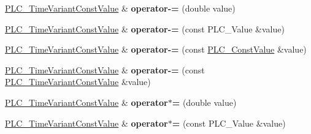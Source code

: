 \begin{DoxyCompactItemize}
\item 
\hypertarget{classns3_1_1PLC__TimeVariantConstValue_a9b188dbf50487e89a085ddb3b8d89bef}{\hyperlink{classns3_1_1PLC__TimeVariantConstValue}{\-P\-L\-C\-\_\-\-Time\-Variant\-Const\-Value} \& {\bfseries operator-\/=} (double value)}\label{classns3_1_1PLC__TimeVariantConstValue_a9b188dbf50487e89a085ddb3b8d89bef}

\item 
\hypertarget{classns3_1_1PLC__TimeVariantConstValue_af7d15a91624d5f6524967326b73e2f4c}{\hyperlink{classns3_1_1PLC__TimeVariantConstValue}{\-P\-L\-C\-\_\-\-Time\-Variant\-Const\-Value} \& {\bfseries operator-\/=} (const \-P\-L\-C\-\_\-\-Value \&value)}\label{classns3_1_1PLC__TimeVariantConstValue_af7d15a91624d5f6524967326b73e2f4c}

\item 
\hypertarget{classns3_1_1PLC__TimeVariantConstValue_a72ef5cc1060865ace5d202574e70672e}{\hyperlink{classns3_1_1PLC__TimeVariantConstValue}{\-P\-L\-C\-\_\-\-Time\-Variant\-Const\-Value} \& {\bfseries operator-\/=} (const \hyperlink{classns3_1_1PLC__ConstValue}{\-P\-L\-C\-\_\-\-Const\-Value} \&value)}\label{classns3_1_1PLC__TimeVariantConstValue_a72ef5cc1060865ace5d202574e70672e}

\item 
\hypertarget{classns3_1_1PLC__TimeVariantConstValue_a7742da3fea366241325e4a828bf9d600}{\hyperlink{classns3_1_1PLC__TimeVariantConstValue}{\-P\-L\-C\-\_\-\-Time\-Variant\-Const\-Value} \& {\bfseries operator-\/=} (const \hyperlink{classns3_1_1PLC__TimeVariantConstValue}{\-P\-L\-C\-\_\-\-Time\-Variant\-Const\-Value} \&value)}\label{classns3_1_1PLC__TimeVariantConstValue_a7742da3fea366241325e4a828bf9d600}

\item 
\hypertarget{classns3_1_1PLC__TimeVariantConstValue_aad652a2600842a68bd4b8e409973ab31}{\hyperlink{classns3_1_1PLC__TimeVariantConstValue}{\-P\-L\-C\-\_\-\-Time\-Variant\-Const\-Value} \& {\bfseries operator$\ast$=} (double value)}\label{classns3_1_1PLC__TimeVariantConstValue_aad652a2600842a68bd4b8e409973ab31}

\item 
\hypertarget{classns3_1_1PLC__TimeVariantConstValue_a280e4bd69e9e9183c8e636688a486f29}{\hyperlink{classns3_1_1PLC__TimeVariantConstValue}{\-P\-L\-C\-\_\-\-Time\-Variant\-Const\-Value} \& {\bfseries operator$\ast$=} (const \-P\-L\-C\-\_\-\-Value \&value)}\label{classns3_1_1PLC__TimeVariantConstValue_a280e4bd69e9e9183c8e636688a486f29}


\end{DoxyCompactItemize}
